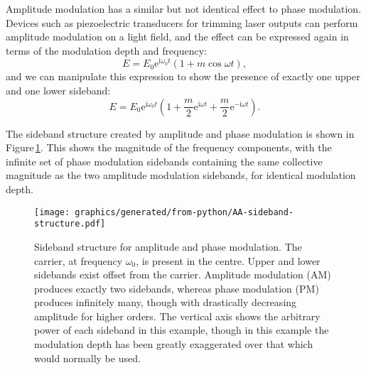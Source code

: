 Amplitude modulation has a similar but not identical effect to phase modulation. Devices such as piezoelectric transducers for trimming laser outputs can perform amplitude modulation on a light field, and the effect can be expressed again in terms of the modulation depth and frequency:
\begin{equation}
  E = E_0 \text{e}^{\text{i} \omega_0 t} \left( 1 + m \cos{\omega t} \right),
\end{equation}
and we can manipulate this expression to show the presence of exactly one upper and one lower sideband:
\begin{equation}
  \label{eq:field-amp-mod}
  E = E_0 \text{e}^{\text{i} \omega_0 t} \left( 1 + \frac{m}{2} \text{e}^{\text{i} \omega t} + \frac{m}{2} \text{e}^{-\text{i} \omega t} \right).
\end{equation}

The sideband structure created by amplitude and phase modulation is shown in Figure\,\ref{fig:sideband-structure}. This shows the magnitude of the frequency components, with the infinite set of phase modulation sidebands containing the same collective magnitude as the two amplitude modulation sidebands, for identical modulation depth.

\begin{figure}
  \centering
  \texttt{[image: graphics/generated/from-python/AA-sideband-structure.pdf]}
  \caption[Sideband structure for amplitude and phase modulation]{\label{fig:sideband-structure}Sideband structure for amplitude and phase modulation. The carrier, at frequency $\omega_0$, is present in the centre. Upper and lower sidebands exist offset from the carrier. Amplitude modulation (AM) produces exactly two sidebands, whereas phase modulation (PM) produces infinitely many, though with drastically decreasing amplitude for higher orders. The vertical axis shows the arbitrary power of each sideband in this example, though in this example the modulation depth has been greatly exaggerated over that which would normally be used.}
\end{figure}